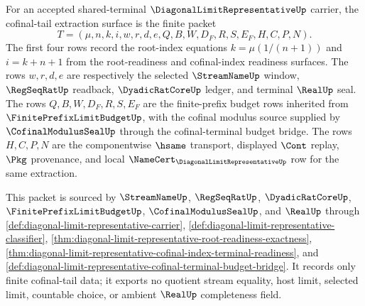 \begin{definition}
\label{def:diagonal-limit-representative-cofinal-tail-extraction}
For an accepted shared-terminal $\DiagonalLimitRepresentativeUp$ carrier, the cofinal-tail extraction surface is the finite packet
$$
T=(\mu,n,k,i,w,r,d,e,Q,B,W,D_F,R,S,E_F,H,C,P,N).
$$
The first four rows record the root-index equations $k=\mu(1/(n+1))$ and $i=k+n+1$ from the root-readiness and cofinal-index readiness surfaces. The rows $w,r,d,e$ are respectively the selected $\StreamNameUp$ window, $\RegSeqRatUp$ readback, $\DyadicRatCoreUp$ ledger, and terminal $\RealUp$ seal. The rows $Q,B,W,D_F,R,S,E_F$ are the finite-prefix budget rows inherited from $\FinitePrefixLimitBudgetUp$, with the cofinal modulus source supplied by $\CofinalModulusSealUp$ through the cofinal-terminal budget bridge. The rows $H,C,P,N$ are the componentwise $\hsame$ transport, displayed $\Cont$ replay, $\Pkg$ provenance, and local $\NameCert_{\DiagonalLimitRepresentativeUp}$ row for the same extraction.

This packet is sourced by $\StreamNameUp$, $\RegSeqRatUp$, $\DyadicRatCoreUp$, $\FinitePrefixLimitBudgetUp$, $\CofinalModulusSealUp$, and $\RealUp$ through \autoref{def:diagonal-limit-representative-carrier}, \autoref{def:diagonal-limit-representative-classifier}, \autoref{thm:diagonal-limit-representative-root-readiness-exactness}, \autoref{thm:diagonal-limit-representative-cofinal-index-terminal-readiness}, and \autoref{def:diagonal-limit-representative-cofinal-terminal-budget-bridge}. It records only finite cofinal-tail data; it exports no quotient stream equality, host limit, selected limit, countable choice, or ambient $\RealUp$ completeness field.
\end{definition}

